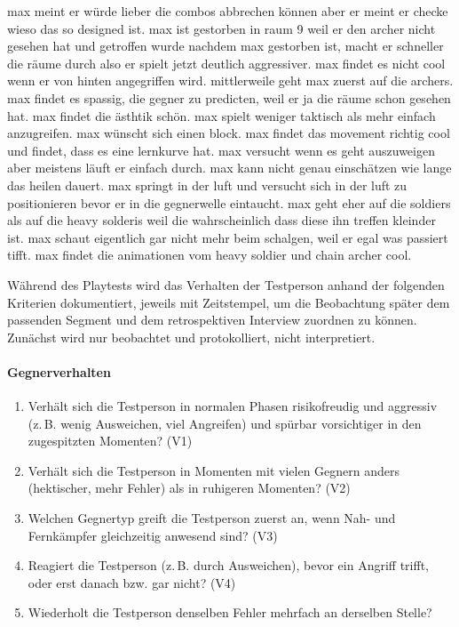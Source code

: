 \documentclass[../Main.tex]{subfiles}
\begin{document}
max meint er würde lieber die combos abbrechen können aber er meint er checke wieso das so designed ist.
max ist gestorben in raum 9 weil er den archer nicht gesehen hat und getroffen wurde
nachdem max gestorben ist, macht er schneller die räume durch
also er spielt jetzt deutlich aggressiver.
max findet es nicht cool wenn er von hinten angegriffen wird.
mittlerweile geht max zuerst auf die archers.
max findet es spassig, die gegner zu predicten, weil er ja die räume schon gesehen hat.
max findet die ästhtik schön.
max spielt weniger taktisch als mehr einfach anzugreifen.
max wünscht sich einen block.
max findet das movement richtig cool und findet, dass es eine lernkurve hat.
max versucht wenn es geht auszuweigen aber meistens läuft er einfach durch.
max kann nicht genau einschätzen wie lange das heilen dauert.
max springt in der luft und versucht sich in der luft zu positionieren bevor er in die gegnerwelle eintaucht.
max geht eher auf die soldiers als auf die heavy solderis weil die wahrscheinlich dass diese ihn treffen kleinder ist.
max schaut eigentlich gar nicht mehr beim schalgen, weil er egal was passiert tifft.
max findet die animationen vom heavy soldier und chain archer cool.

Während des Playtests wird das Verhalten der Testperson anhand der folgenden Kriterien dokumentiert, jeweils mit Zeitstempel, um die Beobachtung später dem passenden Segment und dem retrospektiven Interview zuordnen zu können. Zunächst wird nur beobachtet und protokolliert, nicht interpretiert.

\paragraph{Gegnerverhalten}
\begin{enumerate}[label=\textbf{B\arabic*}, leftmargin=1.5cm, itemsep=0.5em]
\item Verhält sich die Testperson in normalen Phasen risikofreudig und aggressiv (z.\,B. wenig Ausweichen, viel Angreifen) und spürbar vorsichtiger in den zugespitzten Momenten? \hfill (V1)
\item Verhält sich die Testperson in Momenten mit vielen Gegnern anders (hektischer, mehr Fehler) als in ruhigeren Momenten? \hfill (V2)
\item Welchen Gegnertyp greift die Testperson zuerst an, wenn Nah- und Fernkämpfer gleichzeitig anwesend sind? \hfill (V3)
\item Reagiert die Testperson (z.\,B. durch Ausweichen), bevor ein Angriff trifft, oder erst danach bzw. gar nicht? \hfill (V4)
\item Wiederholt die Testperson denselben Fehler mehrfach an derselben Stelle?
\end{enumerate}
\end{document}
